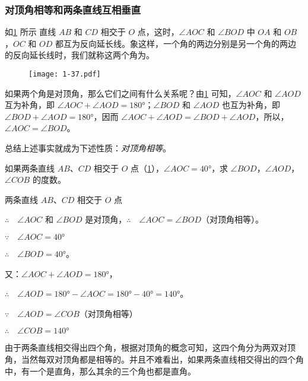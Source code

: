 \subsubsection{对顶角相等和两条直线互相垂直}

如\cref{fig:1-37} 所示 直线 $AB$ 和 $CD$ 相交于 $O$ 点，这时，$\angle AOC$ 和 $\angle BOD$ 中 $OA$ 和 $OB$，$OC$ 和 $OD$ 都互为反向延长线。象这样，一个角的两边分别是另一个角的两边的反向延长线时，我们就称这两个角为。

\begin{figure}
	\texttt{[image: 1-37.pdf]}
	\caption{}\label{fig:1-37}
\end{figure}

如果两个角是对顶角，那么它们之间有什么关系呢？由\cref{fig:1-37} 可知，$\angle AOC$ 和 $\angle AOD$ 互为补角，即 $\angle AOC+\angle AOD=\ang{180}$；$\angle BOD$ 和 $\angle AOD$ 也互为补角，即 $\angle BOD+\angle AOD=\ang{180}$，因而  $\angle AOC+\angle AOD=\angle BOD+\angle AOD$，所以，$\angle AOC=\angle BOD$。

总结上述事实就成为下述性质：\emph{对顶角相等}。

\begin{example}
如果两条直线 $AB$、$CD$ 相交于 $O$ 点（\cref{fig:1-37}），$\angle AOC=\ang{40}$，求 $\angle BOD$，$\angle AOD$，$\angle COB$ 的度数。
\end{example}

\begin{solution}
两条直线 $AB$、$CD$ 相交于 $O$ 点

$\therefore\quad \angle AOC$ 和 $\angle BOD$ 是对顶角，$\therefore\quad \angle AOC=\angle BOD$（对顶角相等）。

$\because\quad \angle AOC=\ang{40}$

$\therefore\quad \angle BOD=\ang{40}$。

又：$\angle AOC+\angle AOD=\ang{180}$，

$\therefore\quad \angle AOD=\ang{180}-\angle AOC=\ang{180}-\ang{40}=\ang{140}$。

$\because\quad \angle AOD=\angle COB$（对顶角相等）

$\therefore\quad \angle COB=\ang{140}$
\end{solution}

由于两条直线相交得出四个角，根据对顶角的概念可知，这四个角分为两双对顶角，当然每双对顶角都是相等的。并且不难看出，如果两条直线相交得出的四个角中，有一个是直角，那么其余的三个角也都是直角。

